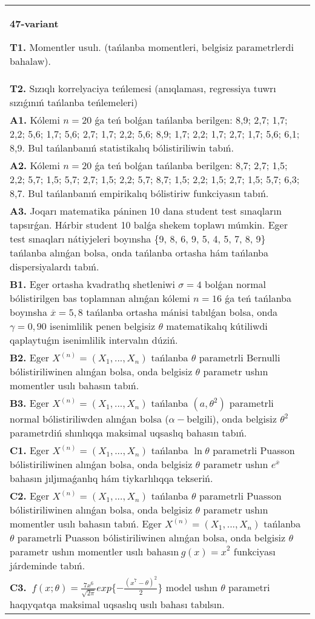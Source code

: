 \documentclass{article}
\begin{document}
\begin{tabular}{m{17cm}}
\textbf{47-variant}
\newline

\textbf{T1.} 
Momentler usulı. (tańlanba momentleri, belgisiz parametrlerdi bahalaw).
 \\
\textbf{T2.} 
Sızıqlı korrelyaciya teńlemesi (anıqlaması, regressiya tuwrı sızıǵınıń tańlanba teńlemeleri)
 \\
\textbf{A1.} 
Kólemi \(n = 20\) ǵa teń bolǵan tańlanba berilgen: 8,9; 2,7; 1,7; 2,2; 5,6; 1,7; 5,6; 2,7; 1,7; 2,2; 5,6; 8,9; 1,7; 2,2; 1,7; 2,7; 1,7; 5,6; 6,1; 8,9. Bul tańlanbanıń statistikalıq bólistiriliwin tabıń.
 \\
\textbf{A2.} 
Kólemi \(n = 20\) ǵa teń bolǵan tańlanba berilgen: 8,7; 2,7; 1,5; 2,2; 5,7; 1,5; 5,7; 2,7; 1,5; 2,2; 5,7; 8,7; 1,5; 2,2; 1,5; 2,7; 1,5; 5,7; 6,3; 8,7. Bul tańlanbanıń empirikalıq bólistiriw funkciyasın tabıń.
 \\
\textbf{A3.} 
Joqarı matematika páninen 10 dana student test sınaqların tapsırǵan. Hárbir student 10 balǵa shekem toplawı múmkin. Eger test sınaqları nátiyjeleri boyınsha \{9, 8, 6, 9, 5, 4, 5, 7, 8, 9\} tańlanba alınǵan bolsa, onda tańlanba ortasha hám tańlanba dispersiyalardı tabıń.
 \\
\textbf{B1.} 
Eger ortasha kvadratlıq shetleniwi \(\sigma = 4\) bolǵan normal bólistirilgen bas toplamnan alınǵan kólemi \(n = 16\) ǵa teń tańlanba boyınsha \(\overline{x} = 5,8\) tańlanba ortasha mánisi tabılǵan bolsa, onda \(\gamma = 0,90\) isenimlilik penen belgisiz \(\theta\) matematikalıq kútiliwdi qaplaytuǵın isenimlilik intervalın dúziń.
 \\
\textbf{B2.} 
Eger \(X^{(n)} = \left( X_{1},...,X_{n} \right)\) tańlanba \(\theta\) parametrli Bernulli bólistiriliwinen alınǵan bolsa, onda belgisiz \(\theta\) parametr ushın momentler usılı bahasın tabıń.
 \\
\textbf{B3.} 
Eger \(X^{(n)} = \left( X_{1},...,X_{n} \right)\) tańlanba \(\left( a,\theta^{2} \right)\) parametrli normal bólistiriliwden alınǵan bolsa (\(\alpha -\)belgili), onda belgisiz \(\theta^{2}\) parametrdiń shınlıqqa maksimal uqsaslıq bahasın tabıń.
 \\
\textbf{C1.} 
Eger \(X^{(n)} = \left( X_{1},...,X_{n} \right)\) tańlanba \(\ln\theta\) parametrli Puasson bólistiriliwinen alınǵan bolsa, onda belgisiz \(\theta\) parametr ushın \(e^{\overline{x}}\) bahasın jıljımaǵanlıq hám tiykarlılıqqa tekseriń.
 \\
\textbf{C2.} 
Eger \(X^{(n)} = \left( X_{1},...,X_{n} \right)\) tańlanba \(\theta\) parametrli Puasson bólistiriliwinen alınǵan bolsa, onda belgisiz \(\theta\) parametr ushın momentler usılı bahasın tabıń. Eger \(X^{(n)} = \left( X_{1},...,X_{n} \right)\) tańlanba \(\theta\) parametrli Puasson bólistiriliwinen alınǵan bolsa, onda belgisiz \(\theta\) parametr ushın momentler usılı bahasın\({\ g(x) = x}^{2}\) funkciyası járdeminde tabıń.
 \\
\textbf{C3.} 
\(\ f(x;\theta) = \frac{7x^{6}}{\sqrt{2\pi}}exp\{ - \frac{(x^{7} - \theta)^{2}}{2}\}\) model ushın \(\theta\) parametri haqıyqatqa maksimal uqsaslıq usılı bahası tabılsın.
 \\

\end{tabular}
\end{document}
